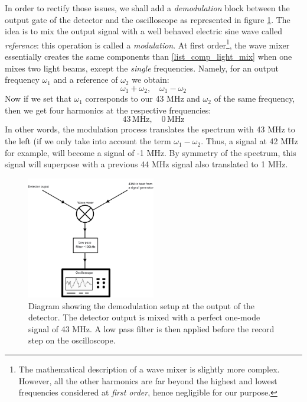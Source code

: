 \documentclass[11pt]{report}
\begin{document}
In order to rectify those issues, we shall add a \textit{demodulation} block between the output gate of the detector and the oscilloscope as represented in figure \ref{fig:wavemixer}. The idea is to mix the output signal with a well behaved electric sine wave called \textit{reference}: this operation is called a \textit{modulation}. At first order\footnote{The mathematical description of a wave mixer is slightly more complex. However, all the other harmonics are far beyond the highest and lowest frequencies considered at \textit{first order}, hence negligible for our purpose.}, the wave mixer essentially creates the same components than \eqref{list_comp_light_mix} when one mixes two light beams, except the \textit{single} frequencies. Namely, for an output frequency $\omega_1$ and a reference of $\omega_2$ we obtain:
\begin{equation}
\omega_1 + \omega_2, \quad \omega_1 - \omega_2
\end{equation}
Now if we set that $\omega_1$ corresponds to our 43 MHz and $\omega_2$ of the same frequency, then we get four harmonics at the respective frequencies:
\begin{equation}
43\,\textrm{MHz}, \quad 0\,\textrm{MHz}
\end{equation}
In other words, the modulation process translates the spectrum with 43 MHz to the left (if we only take into account the term $\omega_1 -\omega_2$. Thus, a signal at 42 MHz for example, will become a signal of -1 MHz. By symmetry of the spectrum, this signal will superpose with a previous 44 MHz signal also translated to 1 MHz. 

\begin{figure}[h!]
\centering
\includegraphics[width=0.5\textwidth]{wavemixer}
\caption{Diagram showing the demodulation setup at the output of the detector. The detector output is mixed with a perfect one-mode signal of 43 MHz. A low pass filter is then applied before the record step on the oscilloscope.}
\label{fig:wavemixer}
\end{figure}
\end{document}
